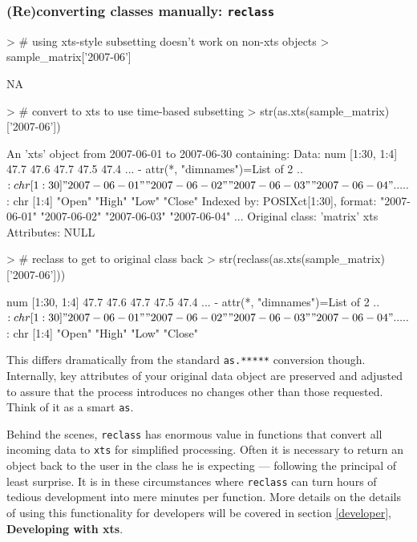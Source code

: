 \documentclass{article}
\begin{document}
\subsubsection*{(Re)converting classes manually: {\tt reclass}}
\begin{Schunk}
\begin{Sinput}
> # using xts-style subsetting doesn't work on non-xts objects
> sample_matrix['2007-06']
\end{Sinput}
\begin{Soutput}
[1] NA
\end{Soutput}
\begin{Sinput}
> # convert to xts to use time-based subsetting
> str(as.xts(sample_matrix)['2007-06'])
\end{Sinput}
\begin{Soutput}
An 'xts' object from 2007-06-01 to 2007-06-30 containing:
  Data: num [1:30, 1:4] 47.7 47.6 47.7 47.5 47.4 ...
 - attr(*, "dimnames")=List of 2
  ..$ : chr [1:30] "2007-06-01" "2007-06-02" "2007-06-03" "2007-06-04" ...
  ..$ : chr [1:4] "Open" "High" "Low" "Close"
  Indexed by:  POSIXct[1:30], format: "2007-06-01" "2007-06-02" "2007-06-03" "2007-06-04" ...
  Original class: 'matrix'  
  xts Attributes:  
 NULL
\end{Soutput}
\begin{Sinput}
> # reclass to get to original class back
> str(reclass(as.xts(sample_matrix)['2007-06']))
\end{Sinput}
\begin{Soutput}
 num [1:30, 1:4] 47.7 47.6 47.7 47.5 47.4 ...
 - attr(*, "dimnames")=List of 2
  ..$ : chr [1:30] "2007-06-01" "2007-06-02" "2007-06-03" "2007-06-04" ...
  ..$ : chr [1:4] "Open" "High" "Low" "Close"
\end{Soutput}
\end{Schunk}

This differs dramatically from the standard {\tt as.*****}
conversion though. Internally, key attributes of your
original data object are preserved and adjusted to
assure that the process introduces no changes other
than those requested.  Think of it as a smart {\tt as}.

Behind the scenes, {\tt reclass} has enormous value
in functions that convert all incoming data to {\tt xts}
for simplified processing. Often it is necessary to
return an object back to the user in the class he
is expecting --- following the principal of least surprise.
It is in these circumstances where {\tt reclass} can
turn hours of tedious development into mere minutes per function. More
details on the details of using this functionality
for developers will be covered in section \ref{developer},  
\textbf{Developing with xts}.
\end{document}
